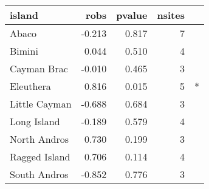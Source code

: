 
\begin{tabular}{l|r|r|r|l}
\hline
island & robs & pvalue & nsites & \\
\hline
Abaco & -0.213 & 0.817 & 7 & \\
\hline
Bimini & 0.044 & 0.510 & 4 & \\
\hline
Cayman Brac & -0.010 & 0.465 & 3 & \\
\hline
Eleuthera & 0.816 & 0.015 & 5 & *\\
\hline
Little Cayman & -0.688 & 0.684 & 3 & \\
\hline
Long Island & -0.189 & 0.579 & 4 & \\
\hline
North Andros & 0.730 & 0.199 & 3 & \\
\hline
Ragged Island & 0.706 & 0.114 & 4 & \\
\hline
South Andros & -0.852 & 0.776 & 3 & \\
\hline
\end{tabular}
